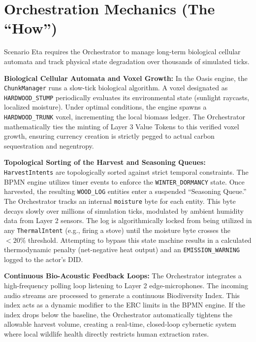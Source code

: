 \section{Orchestration Mechanics (The ``How'')}
Scenario Eta requires the Orchestrator to manage long-term biological cellular automata and track physical state degradation over thousands of simulated ticks.

\textbf{Biological Cellular Automata and Voxel Growth:} In the Oasis engine, the \texttt{ChunkManager} runs a slow-tick biological algorithm. A voxel designated as \texttt{HARDWOOD\_STUMP} periodically evaluates its environmental state (sunlight raycasts, localized moisture). Under optimal conditions, the engine spawns a \texttt{HARDWOOD\_TRUNK} voxel, incrementing the local biomass ledger. The Orchestrator mathematically ties the minting of Layer 3 Value Tokens to this verified voxel growth, ensuring currency creation is strictly pegged to actual carbon sequestration and negentropy.

\textbf{Topological Sorting of the Harvest and Seasoning Queues:} \texttt{HarvestIntents} are topologically sorted against strict temporal constraints. The BPMN engine utilizes timer events to enforce the \texttt{WINTER\_DORMANCY} state. Once harvested, the resulting \texttt{WOOD\_LOG} entities enter a suspended ``Seasoning Queue.'' The Orchestrator tracks an internal \texttt{moisture} byte for each entity. This byte decays slowly over millions of simulation ticks, modulated by ambient humidity data from Layer 2 sensors. The log is algorithmically locked from being utilized in any \texttt{ThermalIntent} (e.g., firing a stove) until the moisture byte crosses the $<20\%$ threshold. Attempting to bypass this state machine results in a calculated thermodynamic penalty (net-negative heat output) and an \texttt{EMISSION\_WARNING} logged to the actor's DID.

\textbf{Continuous Bio-Acoustic Feedback Loops:} The Orchestrator integrates a high-frequency polling loop listening to Layer 2 edge-microphones. The incoming audio streams are processed to generate a continuous Biodiversity Index. This index acts as a dynamic modifier to the ERC limits in the BPMN engine. If the index drops below the baseline, the Orchestrator automatically tightens the allowable harvest volume, creating a real-time, closed-loop cybernetic system where local wildlife health directly restricts human extraction rates.
